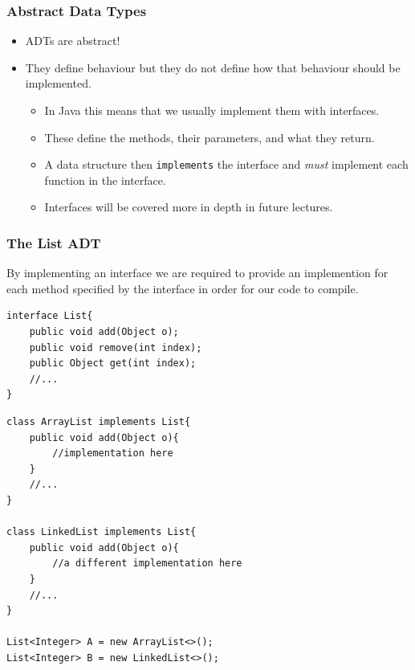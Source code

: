 \documentclass{beamer}
\begin{document}
\begin{frame}
    \frametitle{Abstract Data Types}
    \begin{itemize}
        \item ADTs are abstract! 
        \item They define behaviour but they do not define how that behaviour should be implemented.
        \begin{itemize}
            \item In Java this means that we usually implement them with interfaces. 
                \pause
            \item These define the methods, their parameters, and what they return.
                \pause
            \item A data structure then \lstinline|implements| the interface and \textit{must} implement each function in the interface.
                \pause
            \item Interfaces will be covered more in depth in future lectures.
        \end{itemize}
    \end{itemize}
\end{frame}

\begin{frame}[fragile]
    \frametitle{The List ADT}
    By implementing an interface we are required to provide an implemention for each method specified by the interface in order for our code to compile.
    \vfill
    \begin{minipage}{0.49\textwidth}
        \begin{lstlisting}[basicstyle=\tiny]
interface List{
    public void add(Object o);
    public void remove(int index);
    public Object get(int index);
    //...
}
        \end{lstlisting}
    \end{minipage}
    \begin{minipage}{0.49\textwidth}
        \begin{lstlisting}[basicstyle=\tiny]
class ArrayList implements List{
    public void add(Object o){
        //implementation here
    }
    //...
}

class LinkedList implements List{
    public void add(Object o){
        //a different implementation here
    }
    //...
}

List<Integer> A = new ArrayList<>();
List<Integer> B = new LinkedList<>();
        \end{lstlisting}
    \end{minipage}
\end{frame}
\end{document}
